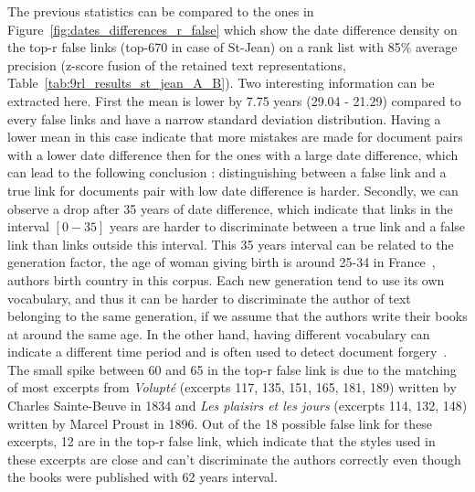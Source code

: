 The previous statistics can be compared to the ones in Figure~\ref{fig:dates_differences_r_false} which show the date difference density on the top-r false links (top-670 in case of St-Jean) on a rank list with 85\% average precision (z-score fusion of the retained text representations, Table~\ref{tab:9rl_results_st_jean_A_B}).
Two interesting information can be extracted here.
First the mean is lower by 7.75 years (29.04 - 21.29) compared to every false links and have a narrow standard deviation distribution.
Having a lower mean in this case indicate that more mistakes are made for document pairs with a lower date difference then for the ones with a large date difference, which can lead to the following conclusion : distinguishing between a false link and a true link for documents pair with low date difference is harder.
Secondly, we can observe a drop after 35 years of date difference, which indicate that links in the interval $\left[0-35\right]$ years are harder to discriminate between a true link and a false link than links outside this interval.
This 35 years interval can be related to the generation factor, the age of woman giving birth is around 25-34 in France~\cite{generations}, authors birth country in this corpus.
Each new generation tend to use its own vocabulary, and thus it can be harder to discriminate the author of text belonging to the same generation, if we assume that the authors write their books at around the same age.
In the other hand, having different vocabulary can indicate a different time period and is often used to detect document forgery~\cite{savoy_stylo}.
The small spike between 60 and 65 in the top-r false link is due to the matching of most excerpts from \textit{Volupté} (excerpts 117, 135, 151, 165, 181, 189) written by Charles Sainte-Beuve in 1834 and \textit{Les plaisirs et les jours} (excerpts 114, 132, 148) written by Marcel Proust in 1896.
Out of the 18 possible false link for these excerpts, 12 are in the top-r false link, which indicate that the styles used in these excerpts are close and can't discriminate the authors correctly even though the books were published with 62 years interval.

